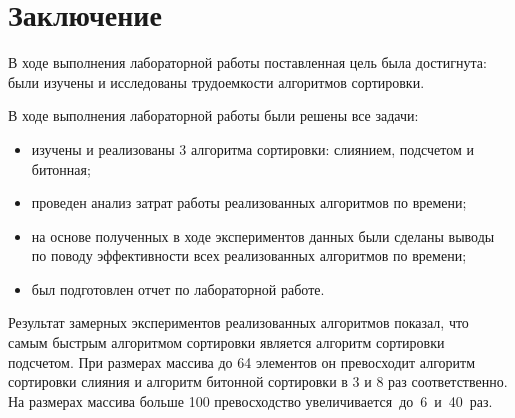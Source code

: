 \chapter*{Заключение}

В ходе выполнения лабораторной работы поставленная цель была достигнута: были изучены и исследованы трудоемкости алгоритмов сортировки.

В ходе выполнения лабораторной работы были решены все задачи:
\begin{itemize}
	\item изучены и реализованы 3 алгоритма сортировки: слиянием, подсчетом и битонная;
	\item проведен анализ затрат работы реализованных алгоритмов по времени;
	\item на основе полученных в ходе экспериментов данных были сделаны выводы по поводу эффективности всех реализованных алгоритмов по времени;
	\item был подготовлен отчет по лабораторной работе.
\end{itemize}

Результат замерных экспериментов реализованных алгоритмов показал, что самым быстрым алгоритмом сортировки является алгоритм сортировки подсчетом. При размерах массива до 64 элементов он превосходит алгоритм сортировки слияния и алгоритм битонной сортировки в 3 и 8 раз соответственно. На размерах массива больше 100 превосходство увеличивается~до~6~и~40~раз.
